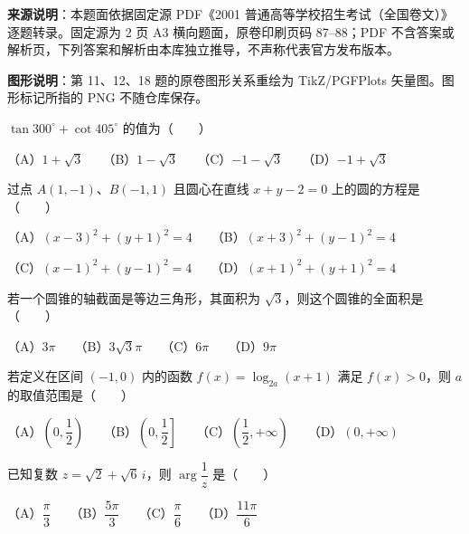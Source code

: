


\begin{gktip}
\textbf{来源说明}：本题面依据固定源 PDF《2001 普通高等学校招生考试（全国卷文）》逐题转录。固定源为 2 页 A3 横向题面，原卷印刷页码 87–88；PDF 不含答案或解析页，下列答案和解析由本库独立推导，不声称代表官方发布版本。

\textbf{图形说明}：第 11、12、18 题的原卷图形关系重绘为 TikZ/PGFPlots 矢量图。图形标记所指的 PNG 不随仓库保存。
\end{gktip}


\begin{question}
$\tan300^\circ+\cot405^\circ$ 的值为\mbox{（　　）}

（A）$1+\sqrt3$　　（B）$1-\sqrt3$　　（C）$-1-\sqrt3$　　（D）$-1+\sqrt3$

\end{question}
\begin{question}
过点 $A(1,-1)$、$B(-1,1)$ 且圆心在直线 $x+y-2=0$ 上的圆的方程是\mbox{（　　）}

（A）$(x-3)^2+(y+1)^2=4$　　（B）$(x+3)^2+(y-1)^2=4$

（C）$(x-1)^2+(y-1)^2=4$　　（D）$(x+1)^2+(y+1)^2=4$

\end{question}
\begin{question}
若一个圆锥的轴截面是等边三角形，其面积为 $\sqrt3$，则这个圆锥的全面积是\mbox{（　　）}

（A）$3\pi$　　（B）$3\sqrt3\pi$　　（C）$6\pi$　　（D）$9\pi$

\end{question}
\begin{question}
若定义在区间 $(-1,0)$ 内的函数 $f(x)=\log_{2a}(x+1)$ 满足 $f(x)>0$，则 $a$ 的取值范围是\mbox{（　　）}

（A）$\left(0,\dfrac12\right)$　　（B）$\left(0,\dfrac12\right]$　　（C）$\left(\dfrac12,+\infty\right)$　　（D）$(0,+\infty)$

\end{question}
\begin{question}
已知复数 $z=\sqrt2+\sqrt6\,i$，则 $\arg\dfrac1z$ 是\mbox{（　　）}

（A）$\dfrac\pi3$　　（B）$\dfrac{5\pi}3$　　（C）$\dfrac\pi6$　　（D）$\dfrac{11\pi}6$

\end{question}

